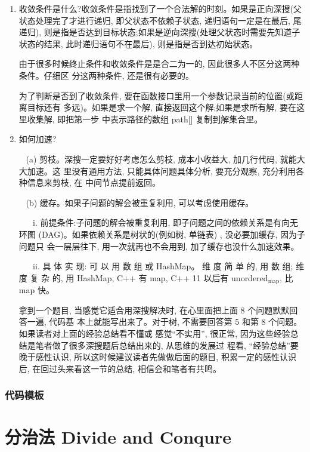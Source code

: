 \documentclass[12pt]{book}
\begin{document}
\begin{enumerate}
\item 收敛条件是什么?收敛条件是指找到了一个合法解的时刻。如果是正向深搜(父状态处理完了才进行递归, 即父状态不依赖子状态, 递归语句一定是在最后, 尾递归), 则是指是否达到目标状态;如果是逆向深搜(处理父状态时需要先知道子状态的结果, 此时递归语句不在最后), 则是指是否到达初始状态。
\label{sec-11-4-2-7}

由于很多时候终止条件和收敛条件是是合二为一的, 因此很多人不区分这两种条件。仔细区
分这两种条件, 还是很有必要的。

为了判断是否到了收敛条件, 要在函数接口里用一个参数记录当前的位置(或距离目标还有
多远)。如果是求一个解, 直接返回这个解;如果是求所有解, 要在这里收集解, 即把第一步
中表示路径的数组 path[] 复制到解集合里。

\item 如何加速?
\label{sec-11-4-2-8}

~ (a) 剪枝。深搜一定要好好考虑怎么剪枝, 成本小收益大, 加几行代码, 就能大大加速。这
里没有通用方法, 只能具体问题具体分析, 要充分观察, 充分利用各种信息来剪枝, 在
中间节点提前返回。

~ (b) 缓存。如果子问题的解会被重复利用, 可以考虑使用缓存。

~ ~ i. 前提条件:子问题的解会被重复利用, 即子问题之间的依赖关系是有向无环图
(DAG)。如果依赖关系是树状的(例如树, 单链表)
, 没必要加缓存, 因为子问题只
会一层层往下, 用一次就再也不会用到, 加了缓存也没什么加速效果。

~ ~ ii. 具 体 实 现: 可 以 用 数 组 或 HashMap。 维 度 简 单 的,  用 数 组; 维 度 复 杂 的,  用
HashMap, C++ 有 map, C++ 11 以后有 unordered$_{\text{map}}$, 比 map 快。

拿到一个题目, 当感觉它适合用深搜解决时, 在心里面把上面 8 个问题默默回答一遍, 代码基
本上就能写出来了。对于树, 不需要回答第 5 和第 8 个问题。如果读者对上面的经验总结看不懂或
感觉“不实用”, 很正常, 因为这些经验总结是笔者做了很多深搜题后总结出来的, 从思维的发展过
程看, “经验总结”要晚于感性认识, 所以这时候建议读者先做做后面的题目, 积累一定的感性认识
后, 在回过头来看这一节的总结, 相信会和笔者有共鸣。
\end{enumerate}

\subsection{代码模板}
\label{sec-11-4-3}

\chapter{分治法 Divide and Conqure}
\label{sec-12}
\end{document}
